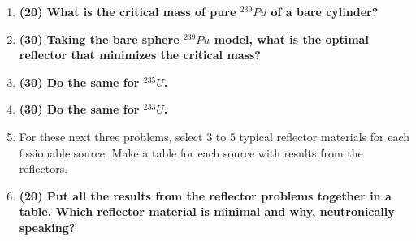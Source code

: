\documentclass[11pt,a4paper]{article}
\begin{document}
\begin{enumerate}[leftmargin=*,topsep=0pt,font=\bfseries]
        \newpage 
    \item\textbf{(20) What is the critical mass of pure $^{239}Pu$ of a bare cylinder?}
        \vspace{0.25in}\\























        \newpage 
    \item\textbf{(30) Taking the bare sphere $^{239}Pu$ model, what is the optimal reflector that minimizes the critical mass?}
    \item\textbf{(30) Do the same for $^{235}U$.}
    \item\textbf{(30) Do the same for $^{233}U$.}
    \item[] For these next three problems, select 3 to 5 typical reflector materials for each fissionable source. Make a table for each source with results from the reflectors. 






























        \newpage 
    \item\textbf{(20) Put all the results from the reflector problems together in a table. Which reflector material is minimal and why, neutronically speaking?}
        \vspace{0.25in}\\


































\end{enumerate}
\end{document}
